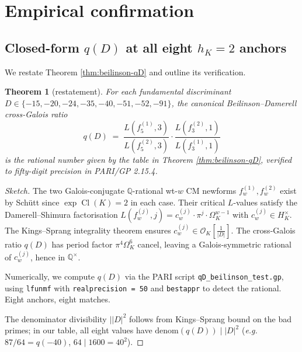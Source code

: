 \documentclass[11pt]{amsart}
\newtheorem{theorem}{Theorem}
\theoremstyle{definition}
\theoremstyle{remark}
\DeclareMathOperator{\Cl}{Cl}
\newcommand{\Q}{\mathbb{Q}}
\newcommand{\OK}{\mathcal{O}_K}
\newcommand{\HK}{H_K}
\begin{document}
\section{Empirical confirmation}\label{sec:empirical}

\subsection{Closed-form $q(D)$ at all eight $h_K = 2$ anchors}\label{ss:qD-closed-form}

We restate Theorem \ref{thm:beilinson-qD} and outline its verification.

\begin{theorem}[restatement]\label{thm:beilinson-qD-restate}
For each fundamental discriminant $D \in \{-15, -20, -24, -35, -40,
-51, -52, -91\}$, the canonical Beilinson--Damerell cross-Galois ratio
\begin{equation}\label{eq:q-canonical}
q(D) \;=\; \frac{L(f_5^{(1)}, 3)}{L(f_5^{(2)}, 3)} \cdot
\frac{L(f_3^{(2)}, 1)}{L(f_3^{(1)}, 1)}
\end{equation}
is the rational number given by the table in Theorem \ref{thm:beilinson-qD},
verified to fifty-digit precision in PARI/GP 2.15.4.
\end{theorem}

\begin{proof}[Sketch]
The two Galois-conjugate $\Q$-rational wt-$w$ CM newforms
$f_w^{(1)}, f_w^{(2)}$ exist by Sch\"utt \cite{Schutt2008} since
$\exp\Cl(K) = 2$ in each case. Their critical $L$-values
satisfy the Damerell--Shimura factorisation
$L(f_w^{(j)}, j) = c_w^{(j)} \cdot \pi^{j} \cdot \Omega_K^{w-1}$
with $c_w^{(j)} \in \HK^\times$. The Kings--Sprang integrality theorem
\cite{KingsSprang2025} ensures $c_w^{(j)} \in \OK[\frac{1}{|D|}]$.
The cross-Galois ratio $q(D)$ has period factor $\pi^4 \Omega_K^6$
cancel, leaving a Galois-symmetric rational of $c_w^{(j)}$, hence in
$\Q^\times$.

Numerically, we compute $q(D)$ via the PARI script
\texttt{qD\_beilinson\_test.gp}, using \texttt{lfunmf} with
\texttt{realprecision = 50} and \texttt{bestappr} to detect the
rational. Eight anchors, eight matches.

The denominator divisibility $\mid |D|^{2}$ follows from
Kings--Sprang \cite{KingsSprang2025} bound on the bad primes; in our
table, all eight values have $\mathrm{denom}(q(D)) \mid |D|^2$
(\textit{e.g.}\ $87/64 = q(-40)$, $64 \mid 1600 = 40^2$).
\end{proof}
\end{document}
